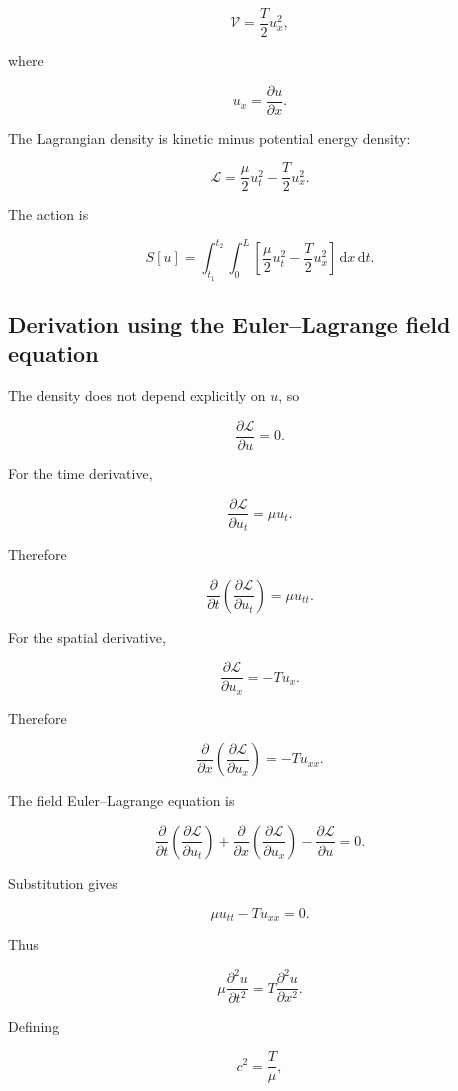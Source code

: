 \[
\mathcal{V}
=
\frac{T}{2}u_{x}^{2},
\]

where

\[
u_{x}=\frac{\partial u}{\partial x}.
\]

The Lagrangian density is kinetic minus potential energy density:

\[
\boxed{
\mathcal{L}
=
\frac{\mu}{2}u_{t}^{2}
-
\frac{T}{2}u_{x}^{2}
}.
\]

The action is

\[
\boxed{
S[u]
=
\int_{t_{1}}^{t_{2}}
\int_{0}^{L}
\left[
\frac{\mu}{2}u_{t}^{2}
-
\frac{T}{2}u_{x}^{2}
\right]
\,\mathrm{d}x\,\mathrm{d}t
}.
\]

\subsection{Derivation using the Euler--Lagrange field equation}

The density does not depend explicitly on \(u\), so

\[
\frac{\partial\mathcal{L}}{\partial u}=0.
\]

For the time derivative,

\[
\frac{\partial\mathcal{L}}{\partial u_{t}}
=
\mu u_{t}.
\]

Therefore

\[
\frac{\partial}{\partial t}
\left(
\frac{\partial\mathcal{L}}{\partial u_{t}}
\right)
=
\mu u_{tt}.
\]

For the spatial derivative,

\[
\frac{\partial\mathcal{L}}{\partial u_{x}}
=
-Tu_{x}.
\]

Therefore

\[
\frac{\partial}{\partial x}
\left(
\frac{\partial\mathcal{L}}{\partial u_{x}}
\right)
=
-Tu_{xx}.
\]

The field Euler--Lagrange equation is

\[
\frac{\partial}{\partial t}
\left(
\frac{\partial\mathcal{L}}{\partial u_{t}}
\right)
+
\frac{\partial}{\partial x}
\left(
\frac{\partial\mathcal{L}}{\partial u_{x}}
\right)
-
\frac{\partial\mathcal{L}}{\partial u}
=0.
\]

Substitution gives

\[
\mu u_{tt}-Tu_{xx}=0.
\]

Thus

\[
\boxed{
\mu
\frac{\partial^{2}u}{\partial t^{2}}
=
T
\frac{\partial^{2}u}{\partial x^{2}}
}.
\]

Defining

\[
c^{2}=\frac{T}{\mu},
\]

